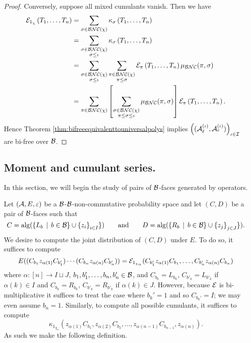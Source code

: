 \begin{proof}
			Conversely, suppose all mixed cumulants vanish.
			Then we have
			\begin{align*}
				\mathcal{E}_{1_\chi}\left( T_1, \ldots, T_n \right)
				&= \sum_{\sigma \in \mathcal{BNC}(\chi)} \kappa_\sigma\left( T_1, \ldots, T_n \right)\\
				&=
				\sum_{\substack{\sigma \in \mathcal{BNC}(\chi) \\ \sigma \leq \iota}} \kappa_\sigma\left( T_1, \ldots, T_n \right) \\
				&=
				\sum_{\substack{\sigma \in \mathcal{BNC}(\chi) \\ \sigma \leq \iota}} \sum_{\substack{\pi \in \mathcal{BNC}(\chi)\\ \pi \leq \sigma}}\mathcal{E}_\pi\left( T_1, \ldots, T_n \right) \mu_{\mathcal{BNC}}(\pi, \sigma) \\
				&=
				\sum_{{\pi\in \mathcal{BNC}(\chi) }} \left[\sum_{\substack{\sigma \in \mathcal{BNC}(\chi)\\ \pi \leq \sigma \leq \iota}} \mu_{\mathcal{BNC}}(\pi, \sigma) \right] \mathcal{E}_\pi\left( T_1, \ldots, T_n \right).
			\end{align*}
			Hence Theorem \ref{thm:bifreeequivalenttouniversalpolys} implies $\left((\mathcal{A}_\ell^{(\iota)}, \mathcal{A}_r^{(\iota)})\right)_{\iota\in\mathcal{I}}$ are bi-free over $\mathcal{B}$.
		\end{proof}



		\subsection{Moment and cumulant series.}

		In this section, we will begin the study of pairs of $\mathcal{B}$-faces generated by operators.

		Let $(\mathcal{A}, E, \varepsilon)$ be a $\mathcal{B}$-$\mathcal{B}$-non-commutative probability space and let $(C, D)$ be a pair of $\mathcal{B}$-faces such that
		\[
		C = \mathrm{alg}(\left\{L_b \, \mid \, b \in \mathcal{B}\right\} \cup \left\{z_i\right\}_{i \in I}\})
		\qquad
		\text{and}
		\qquad
	D = \mathrm{alg}(\left\{R_b \, \mid \, b \in \mathcal{B}\right\} \cup \left\{z_j\right\}_{j \in J}\}).
\]
We desire to compute the joint distribution of $(C, D)$ under $E$.
To do so, it suffices to compute
\[
	E((C_{b_1} z_{\alpha(1)} C_{b'_1}) \cdots (C_{b_n} z_{\alpha(n)} C_{b'_n})) = \mathcal{E}_{1_{\chi_\alpha}}(C_{b_1'} z_{\alpha(1)} C_{b_1}, \ldots, C_{b_n'} z_{\alpha(n)} C_{b_n})
\]
where $\alpha : [n] \to I \sqcup J$, $b_1, b'_1, \ldots, b_n, b'_n \in \mathcal{B}$, and $C_{b_k} = L_{b_k}$, $C_{b'_k} = L_{b'_k}$ if $\alpha(k) \in I$ and $C_{b_k} = R_{b_k}$, $C_{b'_k} = R_{b'_k}$ if $\alpha(k) \in J$.
However, because $\mathcal{E}$ is bi-multiplicative it suffices to treat the case where $b_k' = 1$ and so $C_{b_k'} = I$; we may even assume $b_n = 1$.
Similarly, to compute all possible cumulants, it suffices to compute
\[
	\kappa_{1_{\chi_\alpha}}(z_{\alpha(1)} C_{b_1},
		z_{\alpha(2)} C_{b_2}, \ldots,
		z_{\alpha(n-1)} C_{b_{n-1}},
	z_{\alpha(n)}).
\]
As such we make the following definition.

